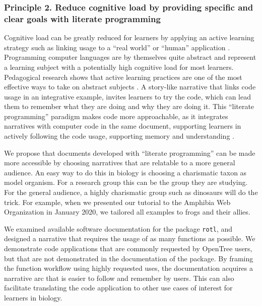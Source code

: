 \documentclass[12pt]{article}
\begin{document}
\subsubsection*{Principle 2. Reduce cognitive load by providing specific and clear goals
with literate programming}

Cognitive load can be greatly reduced for learners by applying an active learning
strategy such as linking usage to a ``real world'' or ``human'' application
\citep{felder2009active}.
Programming computer languages are by themselves quite abstract and represent a
learning subject with a potentially high cognitive load for most learners.
Pedagogical research shows that active learning practices are one of the most effective
ways to take on abstract subjects \citep{freeman2014active}.
A story-like narrative that links code usage in an integrative example, invites learners
to try the code, which can lead them to remember what they are doing and
why they are doing it.
This ``literate programming'' paradigm \citep{knuth1984literate, fritzson2002mathmodelica}
makes code more approachable, as it integrates narratives with computer code in
the same document, supporting learners in actively following
the code usage, supporting memory and understanding \citep{piccolo2016tools}.

We propose that documents developed with ``literate programming'' can be made more
accessible by choosing narratives that are relatable to a more general audience.
An easy way to do this in biology is choosing a charismatic taxon as model organism.
For a research group this can be the group they are studying. For the general audience,
a highly charismatic group such as dinosaurs will do the trick.
For example, when we presented our tutorial to the Amphibia Web Organization \citep{van2002amphibiaweb}
in January 2020, we tailored all examples to frogs and their allies.

We examined available software documentation for the package \texttt{rotl},
and designed a narrative that requires the usage of as many functions as possible.
We demonstrate code applications that are commonly requested by OpenTree users,
but that are not demonstrated in the documentation of the package.
By framing the function workflow using highly requested uses, the documentation acquires a
narrative arc that is easier to follow and remember by users. This can also facilitate
translating the code application to other use cases of interest for learners in biology.

\end{document}

